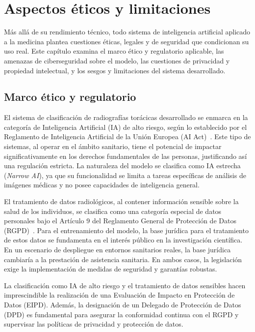 %
\chapter{Aspectos éticos y limitaciones}
\label{sec::capitulo6}

Más allá de su rendimiento técnico, todo sistema de inteligencia artificial aplicado a
la medicina plantea cuestiones éticas, legales y de seguridad que condicionan su uso
real. Este capítulo examina el marco ético y regulatorio aplicable, las amenazas de
ciberseguridad sobre el modelo, las cuestiones de privacidad y propiedad intelectual, y
los sesgos y limitaciones del sistema desarrollado.

\section{Marco ético y regulatorio}
El sistema de clasificación de radiografías torácicas desarrollado se enmarca en la categoría de Inteligencia Artificial (IA) de alto riesgo, según lo establecido por el Reglamento de Inteligencia Artificial de la Unión Europea (AI Act)~\cite{euAIAct2024}. Este tipo de sistemas, al operar en el ámbito sanitario, tiene el potencial de impactar significativamente en los derechos fundamentales de las personas, justificando así una regulación estricta. La naturaleza del modelo se clasifica como IA estrecha (\textit{Narrow AI}), ya que su funcionalidad se limita a tareas específicas de análisis de imágenes médicas y no posee capacidades de inteligencia general.

El tratamiento de datos radiológicos, al contener información sensible sobre la salud de los individuos, se clasifica como una categoría especial de datos personales bajo el Artículo 9 del Reglamento General de Protección de Datos (RGPD)~\cite{euGDPR2016}. Para el entrenamiento del modelo, la base jurídica para el tratamiento de estos datos se fundamenta en el interés público en la investigación científica. En un escenario de despliegue en entornos sanitarios reales, la base jurídica cambiaría a la prestación de asistencia sanitaria. En ambos casos, la legislación exige la implementación de medidas de seguridad y garantías robustas.

La clasificación como IA de alto riesgo y el tratamiento de datos sensibles hacen imprescindible la realización de una Evaluación de Impacto en Protección de Datos (EIPD). Además, la designación de un Delegado de Protección de Datos (DPD) es fundamental para asegurar la conformidad continua con el RGPD y supervisar las políticas de privacidad y protección de datos.

